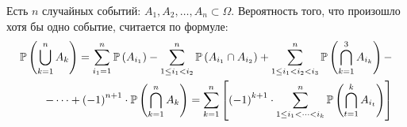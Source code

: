 \begin{theorem}
Есть $n$ случайных событий: $A_1, A_2, \dots, A_n \subset \Omega$.
Вероятность того, что произошло хотя бы одно событие, считается по формуле:
\begin{align*}
    \mathbb{P}\left( \bigcup_{k=1}^n A_k \right)=
    \sum_{i_1=1}^n \mathbb{P}\left( A_{i_1} \right) -
    \sum_{1\le i_1<i_2}^n \mathbb{P}\left( A_{i_1} \cap A_{i_2} \right)
    + \sum_{1\le i_1<i_2<i_3}^n \mathbb{P}\left( \bigcap_{k=1}^3 A_{i_k} \right) -\\
    - \dots +
    \left(-1\right)^{n+1} \cdot \mathbb{P}\left( \bigcap_{k=1}^n A_k \right) =
     \sum_{k=1}^n
        \left[ \left(-1\right)^{k+1} \cdot
            \sum_{1\le i_1<\dots<i_k}^n \mathbb{P}\left( \bigcap_{t=1}^k A_{i_t} \right)
        \right]
\end{align*}
\end{theorem}
